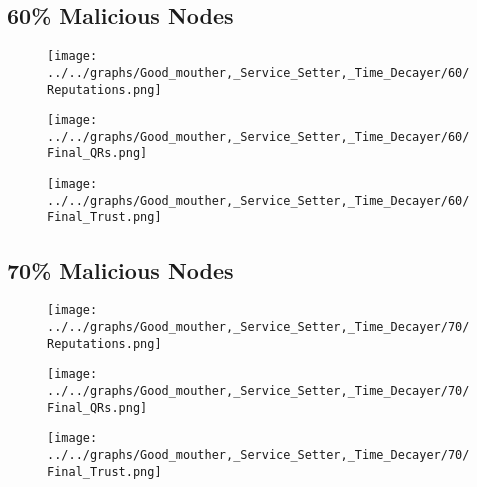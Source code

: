 \begin{minipage}[t]{0.49\columnwidth}
\subsection*{60\% Malicious Nodes}
    \begin{figure}[H]
        \centering
        \texttt{[image: ../../graphs/Good\_mouther,\_Service\_Setter,\_Time\_Decayer/60/Reputations.png]}
    \end{figure}
    \begin{figure}[H]
        \centering
        \texttt{[image: ../../graphs/Good\_mouther,\_Service\_Setter,\_Time\_Decayer/60/Final\_QRs.png]}
    \end{figure}
\end{minipage}
\begin{minipage}[t]{0.49\columnwidth}
    \begin{figure}[H]
        \centering
        \texttt{[image: ../../graphs/Good\_mouther,\_Service\_Setter,\_Time\_Decayer/60/Final\_Trust.png]}
    \end{figure}
\end{minipage}

\begin{minipage}[t]{0.49\columnwidth}
\subsection*{70\% Malicious Nodes}
    \begin{figure}[H]
        \centering
        \texttt{[image: ../../graphs/Good\_mouther,\_Service\_Setter,\_Time\_Decayer/70/Reputations.png]}
    \end{figure}
    \begin{figure}[H]
        \centering
        \texttt{[image: ../../graphs/Good\_mouther,\_Service\_Setter,\_Time\_Decayer/70/Final\_QRs.png]}
    \end{figure}
\end{minipage}
\begin{minipage}[t]{0.49\columnwidth}
    \begin{figure}[H]
        \centering
        \texttt{[image: ../../graphs/Good\_mouther,\_Service\_Setter,\_Time\_Decayer/70/Final\_Trust.png]}
    \end{figure}
\end{minipage}

